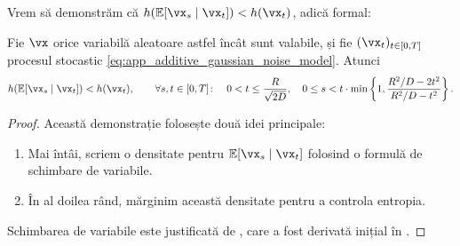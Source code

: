 \documentclass[../../book-main_ro.tex]{subfiles}
\begin{document}
Vrem să demonstrăm că \(h(\Ex[\vx_{s} \mid \vx_{t}]) < h(\vx_{t})\), adică formal:
\begin{theorem}\label{thm:conditioning_reduces_entropy}
    Fie \(\vx\) orice variabilă aleatoare astfel încât  sunt valabile, și fie \((\vx_{t})_{t \in [0, T]}\) procesul stocastic \eqref{eq:app_additive_gaussian_noise_model}. Atunci 
    \begin{equation}
        h(\Ex[\vx_{s} \mid \vx_{t}]) < h(\vx_{t}), \qquad \forall s, t \in [0, T] \colon \quad 0 < t \leq \frac{R}{\sqrt{2D}}, \quad 0 \leq s  < t\cdot\min\bc{1, \frac{R^{2}/D - 2t^{2}}{R^{2}/D - t^{2}}}.
    \end{equation}
\end{theorem}
\begin{proof}
    Această demonstrație folosește două idei principale:
    \begin{enumerate}
        \item Mai întâi, scriem o densitate pentru \(\Ex[\vx_{s} \mid \vx_{t}]\) folosind o formulă de schimbare de variabile.
        \item În al doilea rând, mărginim această densitate pentru a controla entropia.
    \end{enumerate}
    Schimbarea de variabile este justificată de , care a fost derivată inițial în \cite{Gribonval2011-pf}.


\end{proof}
\end{document}
